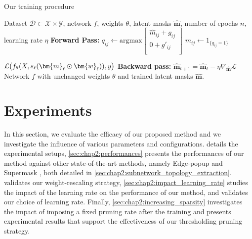 \begin{algorithm}
  \caption{Our training procedure}
  \label{alg:chap2:ASLP}
  \begin{algorithmic}
    \REQUIRE Dataset $\mathcal{D} \subset \mathcal{X} \times \mathcal{Y}$, network $f$,
    weights $\theta$, latent masks $\bm{\hat{m}}$, number of epochs $n$, learning rate $\eta$
    \STATE \textbf{Forward Pass:}
    \STATE $q_{ij} \gets \text{argmax}
      \begin{bmatrix}
        \hat{m}_{ij} + g_{ij} \\
        0 + g'_{ij}                 \\
      \end{bmatrix}$ 
    \STATE $m_{ij} \gets 1_{\{q_{ij}=1\}}$

    \STATE ${\cal L}\big(f_\theta(X,
        s_\ell (\bm{m}_\ell \odot \bm{w}_\ell)),y \big)$
    \STATE \textbf{Backward pass:}
    \STATE $\bm{\hat{m}}_{t+1} = \bm{\hat{m}}_t - \eta \nabla_{\bm{\hat{m}}} \mathcal{L}$ 
    \ENDFOR
    \ENDFOR
    \RETURN Network $f$ with unchanged weights $\theta$ and trained latent masks $\bm{\hat{m}}$.
  \end{algorithmic}
\end{algorithm}


\section{Experiments}
\label{sec:chap2:experiments}

In this section, we  evaluate the efficacy of our proposed method and we
investigate the influence of various parameters and configurations.
 details the experimental setups,
\cref{sec:chap2:performances} presents the performances of our method against
other state-of-the-art methods, namely Edge-popup
\cite{DBLP:conf/cvpr/RamanujanWKFR20} and Supermask
\cite{DBLP:conf/nips/ZhouLLY19}, both detailed in
\cref{sec:chap2:subnetwork_topology_extraction}.
 validates our weight-rescaling
strategy,  \cref{sec:chap2:impact_learning_rate} studies the impact of the
learning rate on the performance of our method, and validates our choice of
learning rate. Finally, \cref{sec:chap2:increasing_sparsity} investigates the
impact of imposing a fixed pruning rate after the training and presents
experimental results that support the effectiveness of our thresholding pruning
strategy.


